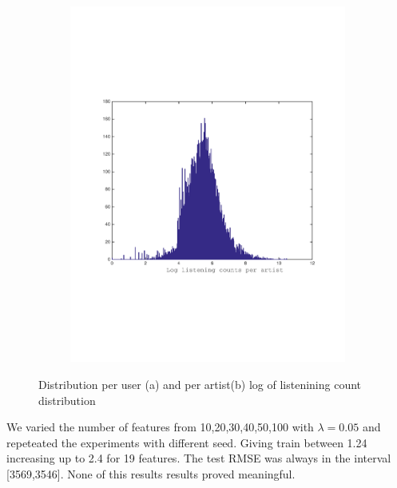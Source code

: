 \begin{figure}[h]
\begin{subfigure}[b]{0.45\textwidth}
    \includegraphics[width=\textwidth]{figures/histCountPerArtist.pdf}
    \caption{}
  \end{subfigure}
  \caption{Distribution per user (a) and per artist(b) log of listenining count distribution}
  \label{fig:new_plot}
\end{figure}

We varied the number of features from 10,20,30,40,50,100 with $\lambda = 0.05$ and repeteated the experiments with different seed.
 Giving train  between 1.24 increasing up to  2.4 for 19 features.  The test RMSE  
 was always in the interval [3569,3546]. None of this results results proved meaningful.

